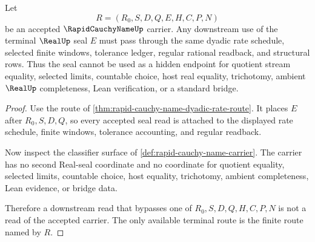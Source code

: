 \begin{theorem}
\label{thm:rapid-cauchy-name-real-seal-boundary}
Let
$$
R=(R_0,S,D,Q,E,H,C,P,N)
$$
be an accepted $\RapidCauchyNameUp$ carrier. Any downstream use of the terminal $\RealUp$ seal $E$ must pass through the same dyadic rate schedule, selected finite windows, tolerance ledger, regular rational readback, and structural rows. Thus the seal cannot be used as a hidden endpoint for quotient stream equality, selected limits, countable choice, host real equality, trichotomy, ambient $\RealUp$ completeness, Lean verification, or a standard bridge.
\end{theorem}
\begin{proof}
Use the route of \autoref{thm:rapid-cauchy-name-dyadic-rate-route}. It places $E$ after $R_0,S,D,Q$, so every accepted seal read is attached to the displayed rate schedule, finite windows, tolerance accounting, and regular readback.

Now inspect the classifier surface of \autoref{def:rapid-cauchy-name-carrier}. The carrier has no second Real-seal coordinate and no coordinate for quotient equality, selected limits, countable choice, host equality, trichotomy, ambient completeness, Lean evidence, or bridge data.

Therefore a downstream read that bypasses one of $R_0,S,D,Q,H,C,P,N$ is not a read of the accepted carrier. The only available terminal route is the finite route named by $R$.
\end{proof}




